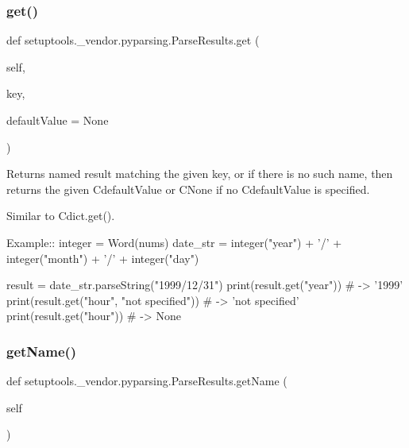 \subsubsection{\texorpdfstring{get()}{get()}}
{\footnotesize\ttfamily def setuptools.\+\_\+vendor.\+pyparsing.\+Parse\+Results.\+get (\begin{DoxyParamCaption}\item[{}]{self,  }\item[{}]{key,  }\item[{}]{default\+Value = {\ttfamily None} }\end{DoxyParamCaption})}

\begin{DoxyVerb}Returns named result matching the given key, or if there is no
such name, then returns the given C{defaultValue} or C{None} if no
C{defaultValue} is specified.

Similar to C{dict.get()}.

Example::
    integer = Word(nums)
    date_str = integer("year") + '/' + integer("month") + '/' + integer("day")           

    result = date_str.parseString("1999/12/31")
    print(result.get("year")) # -> '1999'
    print(result.get("hour", "not specified")) # -> 'not specified'
    print(result.get("hour")) # -> None
\end{DoxyVerb}
 \mbox{\label{classsetuptools_1_1__vendor_1_1pyparsing_1_1ParseResults_ab2ae7e5ea94c1e158d059aa90172f666}} 
\subsubsection{\texorpdfstring{get\+Name()}{getName()}}
{\footnotesize\ttfamily def setuptools.\+\_\+vendor.\+pyparsing.\+Parse\+Results.\+get\+Name (\begin{DoxyParamCaption}\item[{}]{self }\end{DoxyParamCaption})}

